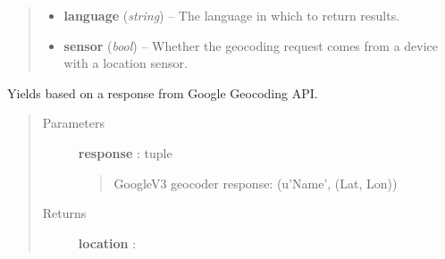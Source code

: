 \documentclass[letterpaper,10pt,english]{sphinxmanual}
\begin{document}
\begin{fulllineitems}
\begin{fulllineitems}
\begin{quote}
\begin{description}
\begin{itemize}


\item {} 
\textbf{language} (\emph{string}) -- The language in which to return results.

\item {} 
\textbf{sensor} (\emph{bool}) -- Whether the geocoding request comes from a
device with a location sensor.

\end{itemize}

\end{description}\end{quote}

\end{fulllineitems}


\begin{fulllineitems}
\label{tethne.services.geocode:tethne.services.geocode.GoogleCoder.coder}
\end{fulllineitems}


\begin{fulllineitems}
\label{tethne.services.geocode:tethne.services.geocode.GoogleCoder.get_location}
Yields {\hyperref[tethne.services.geocode:tethne.services.geocode.Location]{}} based on a response from Google Geocoding API.
\begin{quote}\begin{description}
\item[{Parameters}] \leavevmode
\textbf{response} : tuple
\begin{quote}

GoogleV3 geocoder response: (u'Name', (Lat, Lon))
\end{quote}

\item[{Returns}] \leavevmode
\textbf{location} : {\hyperref[tethne.services.geocode:tethne.services.geocode.Location]{}}

\end{description}\end{quote}

\end{fulllineitems}


\end{fulllineitems}
\end{document}

